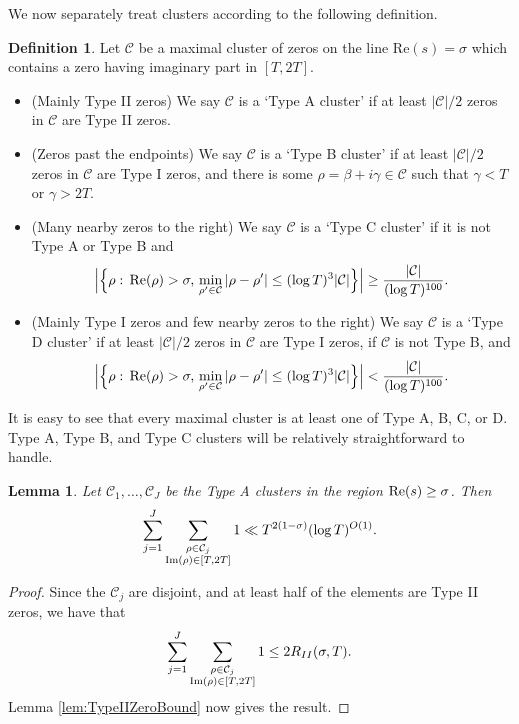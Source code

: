 \documentclass[12pt]{amsart}
\theoremstyle{plain}
\newtheorem{lemma}[theorem]{Lemma}
\theoremstyle{definition}
\newtheorem{definition}[theorem]{Definition}
\theoremstyle{remark}
\begin{document}
We now separately treat clusters according to the following definition.
%
%
%
%
\begin{definition}
Let $\mathcal{C}$ be a maximal cluster of zeros on the line $\text{Re}(s)=\sigma$ which contains a zero having imaginary part in $[T,2T]$.
\begin{itemize}
\item (Mainly Type II zeros) We say $\mathcal{C}$ is a `Type A cluster' if at least $|\mathcal{C}|/2$ zeros in $\mathcal{C}$ are Type II zeros.
\item (Zeros past the endpoints) We say $\mathcal{C}$ is a `Type B cluster' if at least $|\mathcal{C}|/2$ zeros in $\mathcal{C}$ are Type I zeros, and there is some $\rho = \beta+i\gamma \in \mathcal{C}$ such that $\gamma < T$ or $\gamma > 2T$.
\item (Many nearby zeros to the right) We say $\mathcal{C}$ is a `Type C cluster' if it is not Type A or Type B and
\[
\Bigl|\Bigl\{\rho:\,\text{Re}(\rho)>\sigma,\,\min_{\rho'\in\mathcal{C}}|\rho-\rho'|\le (\log{T})^3|\mathcal{C}|\Bigr\}\Bigr|\ge \frac{|\mathcal{C}|}{(\log{T})^{100}}.
\]
\item (Mainly Type I zeros and few nearby zeros to the right) We say $\mathcal{C}$ is a `Type D cluster' if at least $|\mathcal{C}|/2$ zeros in $\mathcal{C}$ are Type I zeros, if $\mathcal{C}$ is not Type B, and
\[
\Bigl|\Bigl\{\rho:\,\text{Re}(\rho)>\sigma,\,\min_{\rho'\in\mathcal{C}}|\rho-\rho'|\le (\log{T})^3|\mathcal{C}|\Bigr\}\Bigr|< \frac{|\mathcal{C}|}{(\log{T})^{100}}.
\]
\end{itemize}
\end{definition}
%
%
%
%
It is easy to see that every maximal cluster is at least one of Type A, B, C, or D. Type A, Type B, and Type C clusters will be relatively straightforward to handle.
%
%
%
%
\begin{lemma}\label{lmm:TypeAClusters}
Let $\mathcal{C}_1,\dots,\mathcal{C}_J$ be the Type A clusters in the region $\textup{Re}(s)\geq\sigma$. Then
\[
\sum_{j=1}^J\sum_{\substack{\rho \in \mathcal{C}_j \\ \textup{Im}(\rho) \in [T,2T]}}1\ll T^{2(1-\sigma)}(\log T)^{O(1)}.
\]
\end{lemma}
%
%
%
%
\begin{proof}
Since the $\mathcal{C}_j$ are disjoint, and at least half of the elements are Type II zeros, we have that
\[
\sum_{j=1}^J\sum_{\substack{\rho \in \mathcal{C}_j \\ \textup{Im}(\rho) \in [T,2T]}}1\le 2R_{II}(\sigma,T).
\]
Lemma \ref{lem:TypeIIZeroBound} now gives the result.
\end{proof}
\end{document}
